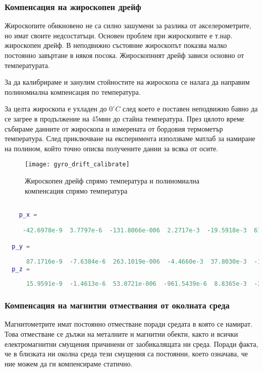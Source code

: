 \subsubsection{Компенсация на жироскопен дрейф}
\FloatBarrier
Жироскопите обикновено не са силно зашумени за разлика от
акселерометрите, но имат своите недсостатъци.
Основен проблем при жироскопите е т.нар. жироскопен дрейф.
В неподвижно състояние жироскопът показва малко постоянно завъртане в някоя посока.
Жироскопният дрейф зависи основно от температурата.

За да калибрираме и занулим стойностите на жироскопа
се налага да направим полиномиална компенсация по температура.

За целта жироскопа е ухладен до \(0^{\circ}C\)
след което е поставен неподвижно бавно да се загрее в продължение на 45мин до стайна температура.
През цялото време събираме данните от жироскопа и измерената от бордовия термометър температура.
След приключване на експеримента използваме матлаб за намиране на полином,
който точно описва получените данни за всяка от осите.

\begin{figure}[htpb!]
    \centering
    \texttt{[image: gyro\_drift\_calibrate]}
    \caption{Жироскопен дрейф спрямо температура и полиномиална компенсация спрямо температура}
    \label{fig:gyro_drift_calibrate}
\end{figure}

\begin{lstlisting}[language=matlab, caption={Получени полиноми за коменсация на жироскопният дрейф}, label={lst:gyro_drift_poly}]

    p_x =

     -42.6978e-9  3.7797e-6  -131.8066e-006  2.2717e-3  -19.5918e-3  67.9744e-3  95.1384e-3  2.2440e+0

  p_y =
  
      87.1716e-9  -7.6384e-6  263.1019e-006  -4.4660e-3  37.8030e-3  -129.2365e-3  -191.6577e-3  -1.1695e+0
  p_z =
  
      15.9591e-9  -1.4613e-6  53.0721e-006  -961.5439e-6  8.8365e-3  -33.3197e-3  -44.0584e-003  -1.9076e+0

\end{lstlisting}


\FloatBarrier


\subsubsection{Компенсация на магнитни отмествания от околната среда}
\FloatBarrier
Магнитометрите имат постоянно отместване поради средата в която се намират.
Това отместване се дължи на металните и магнитни обекти,
както и всички електромагнитни смущения причинени от заобикалящата ни среда.
Поради факта, че в близката ни околна среда тези смущения са постоянни, което означава, че ние можем да ги компенсираме статично.


